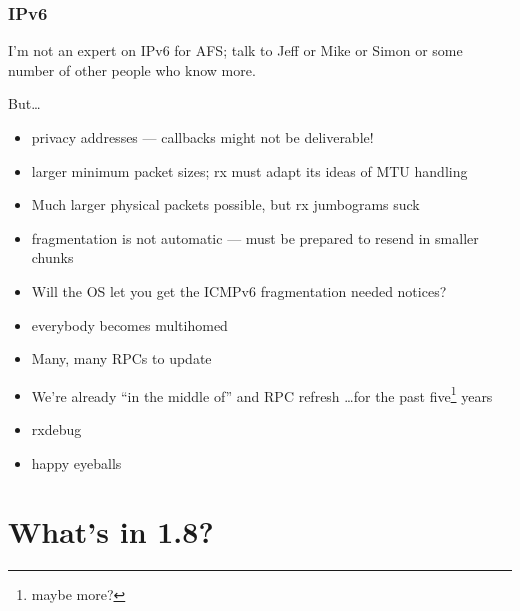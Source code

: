 \documentclass{beamer}
\begin{document}
\begin{frame}
\frametitle{IPv6}
I'm not an expert on IPv6 for AFS; talk to Jeff or Mike or Simon
or some number of other people who know more.

But\ldots
\begin{itemize}
\item{privacy addresses --- callbacks might not be deliverable!}
\item{larger minimum packet sizes; rx must adapt its ideas of MTU handling}
\item{Much larger physical packets possible, but rx jumbograms suck}
\item{fragmentation is not automatic --- must be prepared to resend
	in smaller chunks}
\item{Will the OS let you get the ICMPv6 fragmentation needed notices?}
\item{everybody becomes multihomed}
\item{Many, many RPCs to update}
\item{We're already ``in the middle of'' and RPC refresh \ldots for the
	past five\footnote{maybe more?} years}
\item{rxdebug}
\item{happy eyeballs}
\end{itemize}
\end{frame}

\section{What's in 1.8?}

\end{document}
